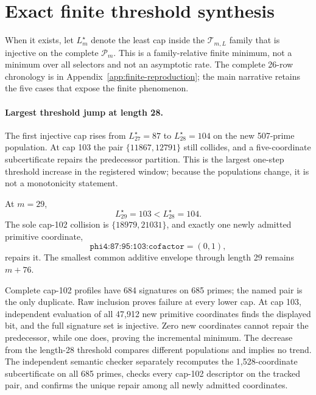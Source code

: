 \documentclass[11pt]{article}
\begin{document}
\section{Exact finite threshold synthesis}

When it exists, let \(L_m^\star\) denote the least cap inside the
\(\mathcal T_{m,L}\) family that is injective on the complete
\(\mathcal P_m\).  This is a family-relative finite minimum, not a minimum
over all selectors and not an asymptotic rate.  The complete 26-row
chronology is in Appendix~\ref{app:finite-reproduction}; the main
narrative retains the five cases that expose the finite phenomenon.

\paragraph{Largest threshold jump at length 28.}
The first injective cap rises from \(L_{27}^\star=87\) to
\(L_{28}^\star=104\) on the new 507-prime population.  At cap 103 the pair
\(\{11867,12791\}\) still collides, and a five-coordinate subcertificate
repairs the predecessor partition.  This is the largest one-step threshold
increase in the registered window; because the populations change, it is not
a monotonicity statement.

{}
At \(m=29\),
\[
 L_{29}^\star=103<L_{28}^\star=104.
\]
The sole cap-102 collision is \(\{18979,21031\}\), and exactly one newly
admitted primitive coordinate,
\[
\texttt{phi4:87:95:103:cofactor}=(0,1),
\]
repairs it.  The smallest common additive envelope through length 29 remains
\(m+76\).

\begin{claimproof}
Complete cap-102 profiles have 684 signatures on 685 primes; the named pair
is the only duplicate.  Raw inclusion proves failure at every lower cap.
At cap 103, independent evaluation of all 47,912 new primitive coordinates
finds the displayed bit, and the full signature set is injective.  Zero new
coordinates cannot repair the predecessor, while one does, proving the
incremental minimum.  The decrease from the length-28 threshold compares
different populations and implies no trend.  The independent semantic
checker separately
recomputes the 1,528-coordinate subcertificate on all 685 primes, checks every
cap-102 descriptor on the tracked pair, and confirms the unique repair among
all newly admitted coordinates.
\end{claimproof}
\end{document}

